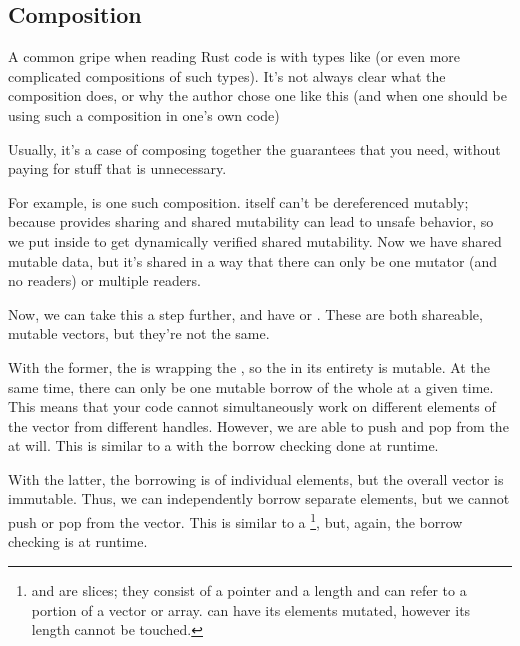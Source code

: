 \subsection*{Composition}

A common gripe when reading Rust code is with types like  (or even more complicated compositions 
of such types). It's not always clear what the composition does, or why the author chose one like this (and when one should 
be using such a composition in one's own code)

\blank

Usually, it's a case of composing together the guarantees that you need, without paying for stuff that is unnecessary.

\blank

For example,  is one such composition.  itself can't be dereferenced mutably; because 
 provides sharing and shared mutability can lead to unsafe behavior, so we put  inside to 
get dynamically verified shared mutability. Now we have shared mutable data, but it's shared in a way that there can only 
be one mutator (and no readers) or multiple readers.

\blank

Now, we can take this a step further, and have  or . These are both 
shareable, mutable vectors, but they're not the same.

\blank

With the former, the  is wrapping the , so the  in its entirety is mutable. 
At the same time, there can only be one mutable borrow of the whole  at a given time. This means that your code 
cannot simultaneously work on different elements of the vector from different  handles. However, we are able to 
push and pop from the  at will. This is similar to a  with the borrow checking done at runtime.

\blank

With the latter, the borrowing is of individual elements, but the overall vector is immutable. Thus, we can independently 
borrow separate elements, but we cannot push or pop from the vector. This is similar to a \footnote{\code{\&[T]} 
and  are slices; they consist of a pointer and a length and can refer to a portion of a vector or array. 
 can have its elements mutated, however its length cannot be touched.}, but, again, the borrow checking is 
at runtime.


